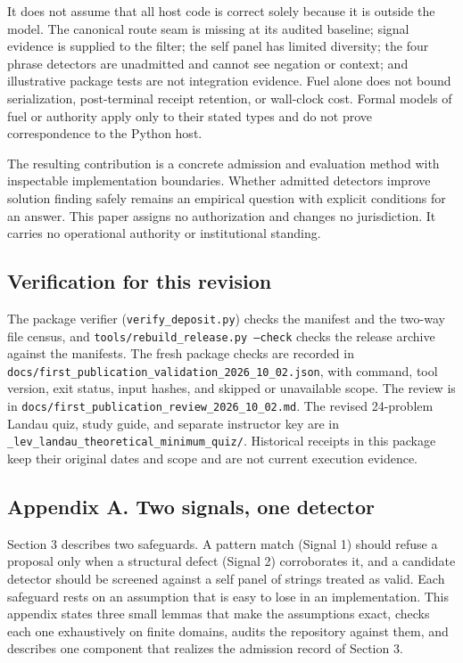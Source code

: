 \documentclass[
  11pt,
]{article}
\begin{document}
It does not assume that all host code is correct solely because it is
outside the model. The canonical route seam is missing at its audited
baseline; signal evidence is supplied to the filter; the self panel has
limited diversity; the four phrase detectors are unadmitted and cannot
see negation or context; and illustrative package tests are not
integration evidence. Fuel alone does not bound serialization,
post-terminal receipt retention, or wall-clock cost. Formal models of
fuel or authority apply only to their stated types and do not prove
correspondence to the Python host.

The resulting contribution is a concrete admission and evaluation method
with inspectable implementation boundaries. Whether admitted detectors
improve solution finding safely remains an empirical question with
explicit conditions for an answer. This paper assigns no authorization
and changes no jurisdiction. It carries no operational authority or
institutional standing.

\hypertarget{verification-for-this-revision}{%
\subsection{Verification for this
revision}\label{verification-for-this-revision}}

The package verifier (\texttt{\nolinkurl{verify_deposit.py}})
checks the manifest and the two-way file census, and
\texttt{tools/rebuild\_release.py --check} checks the
release archive against the manifests. The fresh package checks are
recorded in
\texttt{\nolinkurl{docs/first_publication_validation_2026_10_02.json}},
with command, tool version, exit status, input hashes, and skipped or
unavailable scope. The review is in
\texttt{\nolinkurl{docs/first_publication_review_2026_10_02.md}}.
The revised 24-problem Landau quiz, study guide, and separate instructor
key are in
\texttt{\nolinkurl{_lev_landau_theoretical_minimum_quiz/}}.
Historical receipts in this package keep their original dates and scope
and are not current execution evidence.

\hypertarget{appendix-a.-two-signals-one-detector}{%
\subsection{Appendix A. Two signals, one
detector}\label{appendix-a.-two-signals-one-detector}}

Section 3 describes two safeguards. A pattern match (Signal 1) should
refuse a proposal only when a structural defect (Signal 2) corroborates
it, and a candidate detector should be screened against a self panel of
strings treated as valid. Each safeguard rests on an assumption that is
easy to lose in an implementation. This appendix states three small
lemmas that make the assumptions exact, checks each one exhaustively on
finite domains, audits the repository against them, and describes one
component that realizes the admission record of Section 3.
\end{document}
